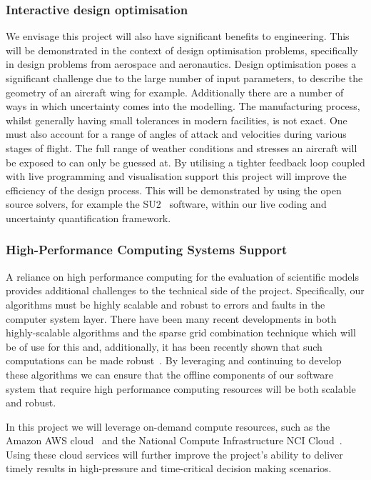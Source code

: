 \documentclass[a4paper,fontsize=12pt]{scrartcl}
\begin{document}
\subsubsection*{Interactive design optimisation}

We envisage this project will also have significant benefits to engineering.
This will be demonstrated in the context of design optimisation problems,
specifically in design problems from aerospace and aeronautics. 
Design optimisation poses a significant challenge due to the large number of input parameters, to describe the geometry of an aircraft wing for example.
Additionally there are a number of ways in which uncertainty comes into the 
modelling. The manufacturing process, 
whilst generally having small tolerances in modern facilities, is not exact.
One must also account for a range of angles of attack and velocities during various 
stages of flight.
The full range of weather conditions and stresses an aircraft will be exposed to can only be guessed at.
By utilising a tighter feedback loop coupled with live programming and visualisation support this project will improve the efficiency of the design process.
This will be demonstrated by using the open source solvers, for example the SU2~\parencite{SU2} software, within our live coding and uncertainty quantification framework.





\subsubsection*{High-Performance Computing Systems Support}

A reliance on high performance computing for the evaluation of
scientific models provides additional challenges to the technical side
of the project. Specifically, our algorithms must be highly scalable
and robust to errors and faults in the computer system layer. There
have been many recent developments in both highly-scalable algorithms
and the sparse grid combination technique which will be of use for
this and, additionally, it has been recently shown that such
computations can be made
robust~\parencite{HardingHLS2015,AliEtal2015,Ali11022016}. By leveraging and
continuing to develop these algorithms we can ensure that the
offline components of our software system that require high performance
computing resources will be both scalable and robust.

In this project we will leverage on-demand compute resources, such as
the Amazon AWS cloud~\parencite{amazon_aws} and the National Compute
Infrastructure NCI Cloud~\parencite{nci_cloud}. Using these cloud
services will further improve the project's ability to deliver timely
results in high-pressure and time-critical decision making scenarios.
\end{document}
